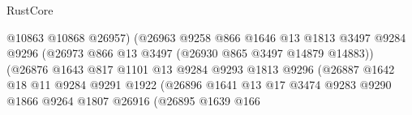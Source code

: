 \begin{lexlean}{RustCore}
\begin{coremodule}
                                              @10863
                                              @10868
                                              @26957)
                                            (@26963
                                              @9258
                                              @866
                                              @1646
                                              @13
                                              @1813
                                              @3497
                                              @9284
                                              @9296
                                              (@26973
                                                @866
                                                @13
                                                @3497
                                                (@26930 @865 @3497 @14879 @14883))
                                              (@26876
                                                @1643
                                                @817
                                                @1101
                                                @13
                                                @9284
                                                @9293
                                                @1813
                                                @9296
                                                (@26887
                                                  @1642
                                                  @18
                                                  @11
                                                  @9284
                                                  @9291
                                                  @1922
                                                  (@26896
                                                    @1641
                                                    @13
                                                    @17
                                                    @3474
                                                    @9283
                                                    @9290
                                                    @1866
                                                    @9264
                                                    @1807
                                                    @26916
                                                    (@26895
                                                      @1639
                                                      @166

\end{coremodule}
\end{lexlean}
